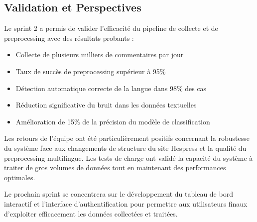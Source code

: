 \subsection{Validation et Perspectives}

Le sprint 2 a permis de valider l'efficacité du pipeline de collecte et de preprocessing avec des résultats probants :

\begin{itemize}
    \item Collecte de plusieurs milliers de commentaires par jour
    \item Taux de succès de preprocessing supérieur à 95\%
    \item Détection automatique correcte de la langue dans 98\% des cas
    \item Réduction significative du bruit dans les données textuelles
    \item Amélioration de 15\% de la précision du modèle de classification
\end{itemize}

Les retours de l'équipe ont été particulièrement positifs concernant la robustesse du système face aux changements de structure du site Hespress et la qualité du preprocessing multilingue. Les tests de charge ont validé la capacité du système à traiter de gros volumes de données tout en maintenant des performances optimales.

Le prochain sprint se concentrera sur le développement du tableau de bord interactif et l'interface d'authentification pour permettre aux utilisateurs finaux d'exploiter efficacement les données collectées et traitées.